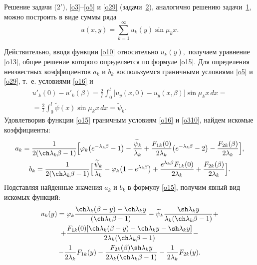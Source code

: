 Решение задачи (\hyperlink{sab:(2')}{$2'$}), \eqref{o3}--\eqref{o5} и \eqref{o29} (задачи~\hyperlink{sab:task2}{2}), аналогично решению задачи~\hyperlink{sab:task1}{1}, можно построить в виде суммы ряда
\begin{equation}\label{o31}
u(x,y)=\sum\limits_{k=1}^{\infty} u_k(y)\sin\mu_kx.
\end{equation}

Действительно, вводя функции \eqref{o10} относительно $u_k(y),$ получаем уравнение \eqref{o13}, общее решение которого определяется по формуле \eqref{o15}. 
Для определения неизвестных коэффициентов $a_k$ и $b_k$ воспользуемся граничными условиями \eqref{o5} и \eqref{o29}, т.~е. условиями \eqref{o16} и
\begin{multline}\label{o310}
u'_k(0)-u'_k(\beta)=\frac{2}{l}\int _{0}^{l}\bigl[u_y(x,0)-u_y(x,\beta)\bigr]\sin\mu_kx\,dx=
\\
=
 \frac{2}{l}\int _{0}^{l}\widetilde{\psi}(x)\sin\mu_kx\,dx=\widetilde{\psi}_k.
\end{multline}
Удовлетворив функции \eqref{o15} граничным условиям \eqref{o16} и \eqref{o310}, найдем искомые коэффициенты:
\begin{gather}
a_k=\frac{1}{2(\ch\lambda_k\beta-1)}
\Bigl[\varphi_k\bigl(e^{-\lambda_k\beta}-1\bigr)-\frac{\widetilde{\psi}_k}{\lambda_k}+ \frac{F_{1k}(0)}{2\lambda_k}
\bigl(e^{-\lambda_k\beta}-2\bigr)- \frac{F_{2k}(\beta)}{2\lambda_k}
\Bigr],
\\
b_k=\frac{1}{2(\ch\lambda_k\beta-1)}
\Bigl[\frac{\widetilde{\psi}_k}{\lambda_k}-\varphi_k\bigl(1-e^{\lambda_k\beta}\bigr)+ \frac{e^{\lambda_k\beta}F_{1k}(0)}{2\lambda_k}+\frac{F_{2k}(\beta)}{2\lambda_k}
\Bigr].
\end{gather}
Подставляя найденные значения $a_k$ и $b_k$ в формулу \eqref{o15}, получим явный вид искомых функций:
\begin{multline}
u_k(y)=\varphi_k\frac{\ch\lambda_k(\beta-y)-\ch\lambda_ky}{(\ch\lambda_k\beta-1)}- \widetilde{\psi}_k\frac{\sh\lambda_ky}{\lambda_k(\ch\lambda_k\beta-1)}+
\\
\label{o32}
+\frac{F_{1k}(0)[\ch\lambda_k(\beta-y)-\ch\lambda_ky-\sh\lambda_ky]}{2\lambda_k(\ch\lambda_k\beta-1)}- \\
- \frac{1}{2\lambda_k}F_{1k}(y)-\frac{F_{2k}(\beta)\sh\lambda_ky}{2\lambda_k(\ch\lambda_k\beta-1)}- \frac{1}{2\lambda_k}F_{2k}(y).
\end{multline}

\smallskip

\hypertarget{sab:lemma1}{}

